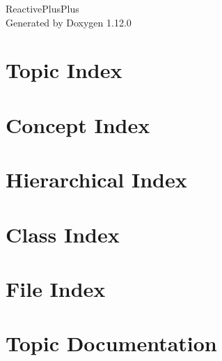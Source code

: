 \documentclass[twoside]{book}
\newcommand{\+}{\discretionary{\mbox{\scriptsize$\hookleftarrow$}}{}{}}
\newcommand{\clearemptydoublepage}{%
    \newpage{\pagestyle{empty}\cleardoublepage}%
  }
\begin{document}
  \raggedbottom
    \hypersetup{pageanchor=false,
                bookmarksnumbered=true,
                pdfencoding=unicode
               }
  \begin{titlepage}
  \vspace*{7cm}
  \begin{center}%
  {\Large Reactive\+Plus\+Plus}\\
  \vspace*{1cm}
  {\large Generated by Doxygen 1.12.0}\\
  \end{center}
  \end{titlepage}
  \clearemptydoublepage
  \tableofcontents
  \clearemptydoublepage
  \hypersetup{pageanchor=true}

\chapter{Topic Index}

\chapter{Concept Index}

\chapter{Hierarchical Index}

\chapter{Class Index}

\chapter{File Index}

\chapter{Topic Documentation}



\end{document}
